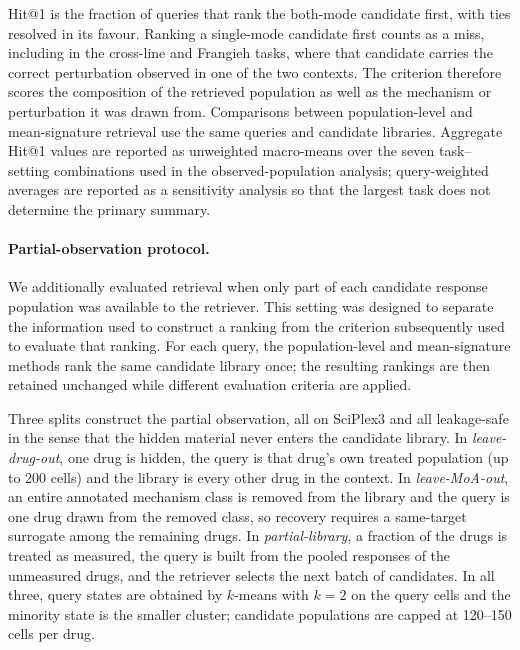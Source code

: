 \documentclass[11pt,letterpaper]{article}
\begin{document}
Hit@1 is the fraction of queries that rank the both-mode candidate first, with ties resolved in its
favour. Ranking a single-mode candidate first counts as a miss, including in the cross-line and
Frangieh tasks, where that candidate carries the correct perturbation observed in one of the two
contexts. The criterion therefore scores the composition of the retrieved population as well as the
mechanism or perturbation it was drawn from.
Comparisons between population-level and mean-signature retrieval use the same queries and
candidate libraries. Aggregate Hit@1 values are reported as unweighted macro-means over the seven
task--setting combinations used in the observed-population analysis; query-weighted averages are
reported as a sensitivity analysis so that the largest task does not determine the primary summary.

\paragraph{Partial-observation protocol.}
We additionally evaluated retrieval when only part of each candidate response population was
available to the retriever. This setting was designed to separate the information used to construct
a ranking from the criterion subsequently used to evaluate that ranking. For each query, the
population-level and mean-signature methods rank the same candidate library once; the resulting
rankings are then retained unchanged while different evaluation criteria are applied.

Three splits construct the partial observation, all on SciPlex3 and all leakage-safe\cite{Leakage} in the
sense that the hidden material never enters the candidate library. In \emph{leave-drug-out},
one drug is hidden, the query is that drug's own treated population (up to 200 cells) and the
library is every other drug in the context. In \emph{leave-MoA-out}, an entire annotated
mechanism class is removed from the library and the query is one drug drawn from the removed
class, so recovery requires a same-target surrogate among the remaining drugs. In
\emph{partial-library}, a fraction of the drugs is treated as measured, the query is built from
the pooled responses of the unmeasured drugs, and the retriever selects the next batch of
candidates. In all three, query states are obtained by $k$-means with $k=2$ on the query cells
and the minority state is the smaller cluster; candidate populations are capped at 120--150
cells per drug.
\end{document}
